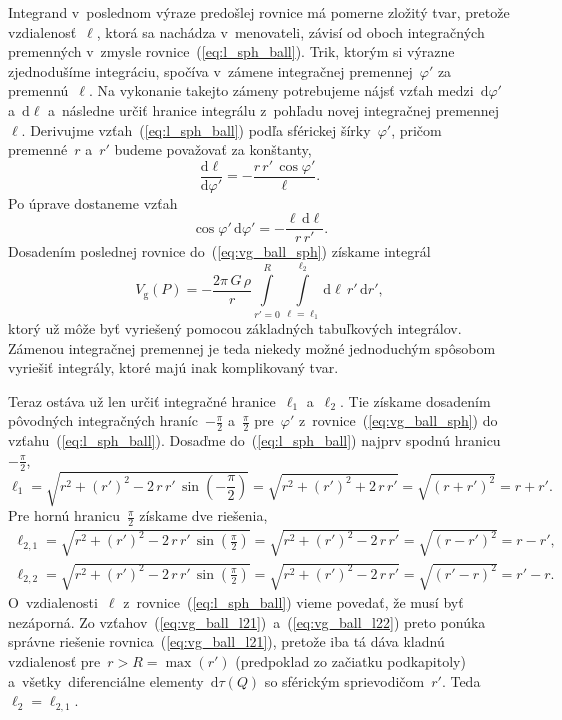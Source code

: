\documentclass[a4paper, 12pt]{book}
\newcommand{\diff}{\mathrm d}
\newcommand{\gidx}{\mathrm g}
\begin{document}
Integrand v~poslednom výraze predošlej rovnice má pomerne zložitý tvar, pretože 
vzdialenosť~$\ell$, ktorá sa nachádza v~menovateli, závisí od oboch 
integračných premenných v~zmysle rovnice~(\ref{eq:l_sph_ball}).  Trik, ktorým 
si výrazne zjednodušíme integráciu, spočíva v~zámene integračnej 
premennej~$\varphi'$ za premennú~$\ell$.  Na vykonanie takejto zámeny 
potrebujeme nájsť vzťah medzi~$\diff \varphi'$ a~$\diff \ell$ a~následne určiť 
hranice integrálu z~pohľadu novej integračnej premennej~$\ell$.  Derivujme 
vzťah~(\ref{eq:l_sph_ball}) podľa sférickej šírky~$\varphi'$, pričom 
premenné~$r$ a~$r'$ budeme považovať za konštanty,
%
\begin{equation}
\frac{\diff \ell}{\diff \varphi'} = -\frac{r \, r' \, \cos\varphi'}{\ell}{.}
\end{equation}
%
Po úprave dostaneme vzťah
%
\begin{equation}
\cos\varphi' \, \diff \varphi' = -\frac{\ell \, \diff \ell}{r \, r'}{.}
\end{equation}
%
Dosadením poslednej rovnice do~(\ref{eq:vg_ball_sph}) získame integrál
%
\begin{equation}
\label{eq:vg_ball_sph_tmp}
V_\gidx(P) = -\frac{2\pi \, G \, \rho}{r} \int\limits_{r' = 0}^R 
\int\limits_{\ell = \ell_1}^{\ell_2} \diff \ell \, r' \, \diff r'{,}
\end{equation}
%
ktorý už môže byť vyriešený pomocou základných tabuľkových integrálov.  Zámenou 
integračnej premennej je teda niekedy možné jednoduchým spôsobom vyriešiť 
integrály, ktoré majú inak komplikovaný tvar.

Teraz ostáva už len určiť integračné hranice~$\ell_1$ a~$\ell_2$.  Tie získame 
dosadením pôvodných integračných hraníc~$-\frac{\pi}{2}$ a~$\frac{\pi}{2}$ 
pre~$\varphi'$ z~rovnice~(\ref{eq:vg_ball_sph}) do 
vzťahu~(\ref{eq:l_sph_ball}).  Dosaďme do~(\ref{eq:l_sph_ball}) najprv spodnú 
hranicu~$-\frac{\pi}{2}$,
%
\begin{equation}
\label{eq:vg_ball_l1}
\ell_1 = \sqrt{r^2 + (r')^2 - 2 \, r \, r' \, \sin\left(-\frac{\pi}{2}\right)} 
= \sqrt{r^2 + (r')^2 + 2 \, r \, r'} = \sqrt{(r + r')^2} = r + r'{.}
\end{equation}
%
Pre hornú hranicu~$\frac{\pi}{2}$ získame dve riešenia,
%
\begin{align}
\label{eq:vg_ball_l21}
\ell_{2,1} = \sqrt{r^2 + (r')^2 - 2 \, r \, r' \, 
\sin\left(\frac{\pi}{2}\right)} = \sqrt{r^2 + (r')^2 - 2 \, r \, r'} = \sqrt{(r 
- r')^2} = r - r'{,}\\
%
\label{eq:vg_ball_l22}
\ell_{2,2} = \sqrt{r^2 + (r')^2 - 2 \, r \, r' \, 
\sin\left(\frac{\pi}{2}\right)} = \sqrt{r^2 + (r')^2 - 2 \, r \, r'} 
= \sqrt{(r' - r)^2} = r' - r{.}
\end{align}
%
O~vzdialenosti~$\ell$ z~rovnice~(\ref{eq:l_sph_ball}) vieme povedať, že musí 
byť nezáporná.  Zo vzťahov~(\ref{eq:vg_ball_l21})~a~(\ref{eq:vg_ball_l22}) 
preto ponúka správne riešenie rovnica~(\ref{eq:vg_ball_l21}), pretože iba tá 
dáva kladnú vzdialenosť pre~$r > R = \max(r')$ (predpoklad zo začiatku 
podkapitoly) a~všetky~diferenciálne elementy~$\diff \tau(Q)$ so sférickým 
sprievodičom~$r'$.  Teda~$\ell_2 = \ell_{2,1}$.
\end{document}
